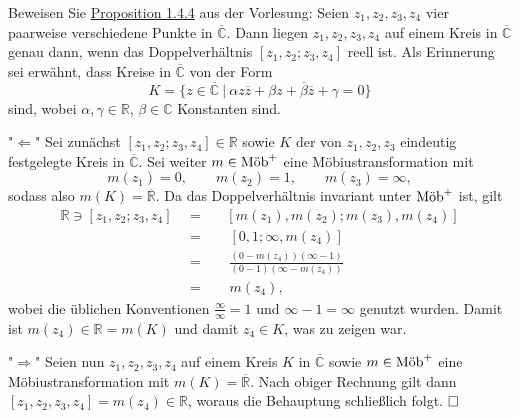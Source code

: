 \documentclass[11pt]{book}
\numberwithin{dummy}{section}
\theoremstyle{nonumberbreak}
\newenvironment{prob}[1][]{\ifthenelse{\equal{#1}{}}{\problem}{\problem[#1]}\rm}{\endproblem}
\newenvironment{sol}[1][]{\ifthenelse{\equal{#1}{}}{\solution}{\solution[#1]}\rm}{\endsolution}
\newcommand{\C}{\mathbb{C}}
\newcommand{\R}{\mathbb{R}}
\newcommand{\RR}{\overline{\mathbb{R}}}
\newcommand{\CC}{\overline{\mathbb{C}}}
\newcommand{\mob}{\textup{Möb}^+}
\begin{document}
\begin{spacing}{1.4}
\hypertarget{Azweivier}{}
\begin{prob}    %
Beweisen Sie \hyperlink{propeinsviervier}{Proposition 1.4.4} aus der Vorlesung: Seien $z_1,z_2,z_3,z_4$ vier paarweise verschiedene Punkte in $\CC$. Dann liegen {$z_1,z_2,z_3,z_4$ }auf einem Kreis in $\CC$ genau dann, wenn das Doppelverhältnis $[z_1,z_2;z_3,z_4]$ reell ist.
\begin{sol}
Als Erinnerung sei erwähnt, dass Kreise in $\CC$ von der Form 
$$K=\{z \in \CC \ \vert \ \alpha z \overline{z} + \beta z + \overline{\beta} \overline{z} + \gamma=0\}$$
sind, wobei $\alpha, \gamma \in \R$, $\beta \in \C$ Konstanten sind. 
\begin{compactenum}
\item["$\Leftarrow$"] Sei zunächst $[z_1,z_2;z_3,z_4] \in \R$ sowie $K$ der von $z_1,z_2,z_3$ eindeutig festgelegte Kreis in $\CC$. Sei weiter $m\in \mob$ eine Möbiustransformation mit 
$$m(z_1)=0, \qquad m(z_2)=1, \qquad m(z_3)=\infty,$$
sodass also $m(K)=\RR$. Da das Doppelverhältnis invariant unter $\mob$ ist, gilt
\begin{alignat*}{5}
\R \ni [z_1,z_2;z_3,z_4] \ \ &=&& \ [m(z_1),m(z_2);m(z_3),m(z_4)] \\
&=&& \ \ [0,1;\infty, m(z_4)]\\
&=&& \ \ \frac{(0-m(z_4))(\infty-1)}{(0-1)(\infty-m(z_4))}\\
&=&& \ \ m(z_4),
\end{alignat*}
wobei die üblichen Konventionen $\frac{\infty}{\infty}=1$ und $\infty-1=\infty$ genutzt wurden. Damit ist $m(z_4) \in \R=m(K)$ und damit $z_4 \in K$, was zu zeigen war.
\item["$\Rightarrow$"] Seien nun $z_1,z_2,z_3,z_4$ auf einem Kreis $K$ in $\CC$ sowie $m \in \mob$ eine Möbiustransformation mit $m(K)=\RR$. Nach obiger Rechnung gilt dann $[z_1,z_2,z_3,z_4]= m(z_4) \in \R$, woraus die Behauptung schließlich folgt. $\hfill \Box$

\end{compactenum}


\end{sol}

\end{prob}









\newpage




\titlespacing*{\section}{-16.5pt}{0pt}{20pt}
\renewcommand*\thesection{}

\end{spacing}
\end{document}
